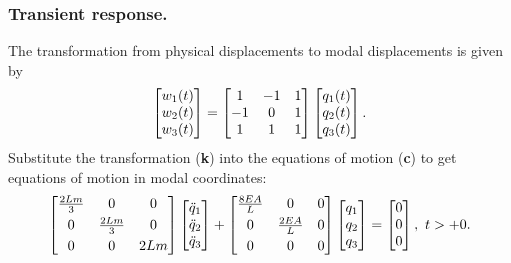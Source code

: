 \documentclass{AeroStructure-ERJohnson}
\begin{document}
\begin{example*}
\subsubsection{Transient response.} The transformation from physical displacements to modal displacements is given by
\begin{align}\label{ex18.2k}
\left[\begin{array}{@{}l@{}}w_{1}(t) \\w_{2}(t) \\w_{3}(t)\end{array}\right]=\left[\begin{array}{@{}ccc@{}}1 & -1 & 1 \\-1 & 0 & 1 \\1 & 1 & 1\end{array}\right]\left[\begin{array}{@{}l@{}}q_{1}(t) \\q_{2}(t) \\q_{3}(t)\end{array}\right].
\end{align}
Substitute the transformation (\textbf{k}) into the equations of motion (\textbf{c}) to get equations of motion in modal coordinates:
\begin{align}\label{ex18.2l}
\left[\begin{array}{@{}ccc@{}}\frac{2 L m}{3} & 0 & 0 \\[3pt] 0 & \frac{2 L m}{3} & 0 \\[3pt] 0 & 0 & 2 L m\end{array}\right]\left[\begin{array}{@{}l@{}}\ddot{q}_{1} \\\ddot{q}_{2} \\\ddot{q}_{3}\end{array}\right]+\left[\begin{array}{@{}ccc@{}}\frac{8 E A}{L} & 0 & 0 \\[3pt] 0 & \frac{2 E A}{L} & 0 \\[3pt] 0 & 0 & 0\end{array}\right]\left[\begin{array}{@{}l@{}}q_{1} \\q_{2} \\q_{3}\end{array}\right]=\left[\begin{array}{@{}l@{}}0 \\0 \\0\end{array}\right],\ t>+0.
\end{align}

\end{example*}
\end{document}
